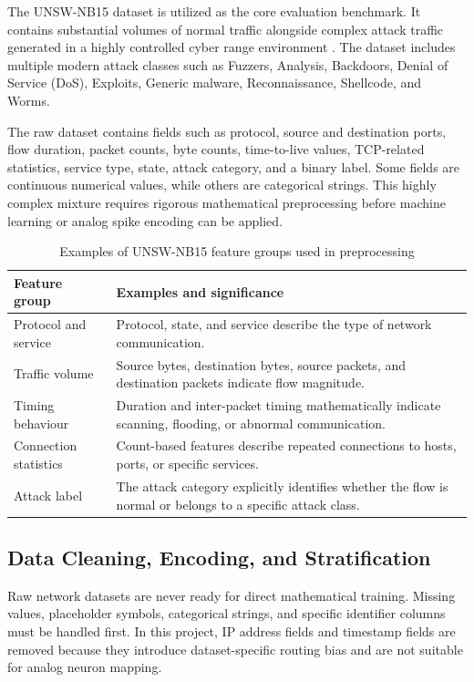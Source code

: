 \documentclass{ieeeaccess}
\begin{document}
The UNSW-NB15 dataset is utilized as the core evaluation benchmark. It contains substantial volumes of normal traffic alongside complex attack traffic generated in a highly controlled cyber range environment \cite{Moustafa2015}. The dataset includes multiple modern attack classes such as Fuzzers, Analysis, Backdoors, Denial of Service (DoS), Exploits, Generic malware, Reconnaissance, Shellcode, and Worms.

The raw dataset contains fields such as protocol, source and destination ports, flow duration, packet counts, byte counts, time-to-live values, TCP-related statistics, service type, state, attack category, and a binary label. Some fields are continuous numerical values, while others are categorical strings. This highly complex mixture requires rigorous mathematical preprocessing before machine learning or analog spike encoding can be applied.

\begin{table}[!t]
\centering
\caption{Examples of UNSW-NB15 feature groups used in preprocessing}
\label{tab:featuregroups}
\begin{tabular}{|p{}|p{}|}
\hline
\textbf{Feature group} & \textbf{Examples and significance} \\
\hline
Protocol and service & Protocol, state, and service describe the type of network communication. \\
\hline
Traffic volume & Source bytes, destination bytes, source packets, and destination packets indicate flow magnitude. \\
\hline
Timing behaviour & Duration and inter-packet timing mathematically indicate scanning, flooding, or abnormal communication. \\
\hline
Connection statistics & Count-based features describe repeated connections to hosts, ports, or specific services. \\
\hline
Attack label & The attack category explicitly identifies whether the flow is normal or belongs to a specific attack class. \\
\hline
\end{tabular}
\end{table}

\subsection{Data Cleaning, Encoding, and Stratification}

Raw network datasets are never ready for direct mathematical training. Missing values, placeholder symbols, categorical strings, and specific identifier columns must be handled first. In this project, IP address fields and timestamp fields are removed because they introduce dataset-specific routing bias and are not suitable for analog neuron mapping. 
\end{document}
